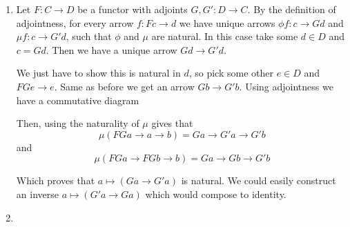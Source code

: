 \begin{exercise}{4}
    \begin{enumerate}
        \item{Let $F \colon C \rightarrow D$ be a functor with adjoints $G, G'
            \colon D \rightarrow C$. By the definition of adjointness, for every
            arrow $f \colon Fc \rightarrow d$ we have unique arrows $\phi f
            \colon c \rightarrow Gd$ and $\mu f \colon c \rightarrow G'd$, such
            that $\phi$ and $\mu$ are natural. In this case take some $d \in D$
            and $c = Gd$. Then we have a unique arrow $Gd \rightarrow G'd$.

            We just have to show this is natural in $d$, so pick some other $e
            \in D$ and $FGe \rightarrow e$. Same as before we get an arrow $Gb
            \rightarrow G'b$. Using adjointness we have a commutative diagram


            Then, using the naturality of $\mu$ gives that
            \begin{equation*}
                \mu(FGa \rightarrow a \rightarrow b) = Ga \rightarrow G'a
                \rightarrow G'b
            \end{equation*}
            and
            \begin{equation*}
                \mu(FGa \rightarrow FGb \rightarrow b) = Ga \rightarrow Gb
                \rightarrow G'b
            \end{equation*}

            Which proves that $a \mapsto (Ga \rightarrow G'a)$ is natural.
            We could easily construct an inverse $a \mapsto (G'a \rightarrow
            Ga)$ which would compose to identity.}
    \item{
        }
    \end{enumerate}
\end{exercise}


